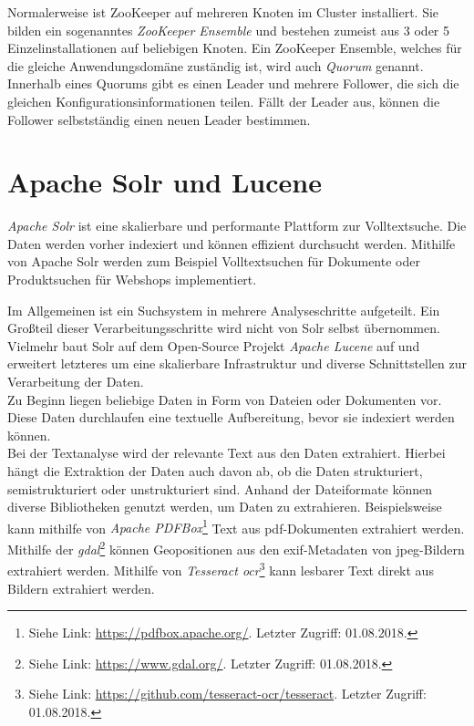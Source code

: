 \noindent
Normalerweise ist ZooKeeper auf mehreren Knoten im Cluster installiert. Sie bilden ein sogenanntes \textit{ZooKeeper Ensemble} und bestehen zumeist aus 3 oder 5 Einzelinstallationen auf beliebigen Knoten. Ein ZooKeeper Ensemble, welches für die gleiche Anwendungsdomäne zuständig ist, wird auch \textit{Quorum} genannt. Innerhalb eines Quorums gibt es einen Leader und mehrere Follower, die sich die gleichen Konfigurationsinformationen teilen. Fällt der Leader aus, können die Follower selbstständig einen neuen Leader bestimmen.\cite{zookeeper_essentials}\\

\section{Apache Solr und Lucene}
\label{sec:theory_solr}
\textit{Apache Solr\texttrademark\thinspace} ist eine skalierbare und performante Plattform zur Volltextsuche. Die Daten werden vorher indexiert und können effizient durchsucht werden.\cite{solr_search} Mithilfe von Apache Solr werden zum Beispiel Volltextsuchen für Dokumente oder Produktsuchen für Webshops implementiert.

\noindent
Im Allgemeinen ist ein Suchsystem in mehrere Analyseschritte aufgeteilt. Ein Großteil dieser Verarbeitungsschritte wird nicht von Solr selbst übernommen. Vielmehr baut Solr auf dem Open-Source Projekt \textit{Apache Lucene\texttrademark\thinspace} auf und erweitert letzteres um eine skalierbare Infrastruktur und diverse Schnittstellen zur Verarbeitung der Daten.\\
Zu Beginn liegen beliebige Daten in Form von Dateien oder Dokumenten vor. Diese Daten durchlaufen eine textuelle Aufbereitung, bevor sie indexiert werden können.\\ 
Bei der Textanalyse wird der relevante Text aus den Daten extrahiert. Hierbei hängt die Extraktion der Daten auch davon ab, ob die Daten strukturiert, semistrukturiert oder unstrukturiert sind. Anhand der Dateiformate können diverse Bibliotheken genutzt werden, um Daten zu extrahieren. Beispielsweise kann mithilfe von \textit{Apache PDFBox\textsuperscript{\textregistered}}\footnote{Siehe Link: \url{https://pdfbox.apache.org/}. Letzter Zugriff: 01.08.2018.} Text aus \acrshort{pdf}-Dokumenten extrahiert werden. Mithilfe der \textit{\gls{gdal}}\footnote{Siehe Link: \url{https://www.gdal.org/}. Letzter Zugriff: 01.08.2018.} können Geopositionen aus den \acrshort{exif}-Metadaten von \acrshort{jpeg}-Bildern extrahiert werden. Mithilfe von \textit{Tesseract \acrshort{ocr}}\footnote{Siehe Link: \url{https://github.com/tesseract-ocr/tesseract}. Letzter Zugriff: 01.08.2018.} kann lesbarer Text direkt aus Bildern extrahiert werden.\cite[S. 39]{solr_search}\\

